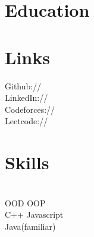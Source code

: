 \documentclass[]{deedy-resume-openfont}
\begin{document}
%
%
\lastupdated

%
%



%
%

\begin{minipage}[t]{0.33\textwidth} 


\section{Education} 

\sectionsep



\section{Links} 
Github:// \href{https://github.com/llucifer97}{} \\
LinkedIn://  \href{https://www.linkedin.com/in/ayush-raj97/}{} \\
Codeforces://  \href{https://codeforces.com/profile/ayush_raj97}{} \\
Leetcode://  \href{https://leetcode.com/llucifer97/}{}
\sectionsep



\section{Skills}
\\
 \textbullet{} OOD  \textbullet{} OOP\\
 \textbullet{} C++ \textbullet{} Javascript\\
   \textbullet{}Java(familiar)  \\
   \\


\end{minipage}
\end{document}
